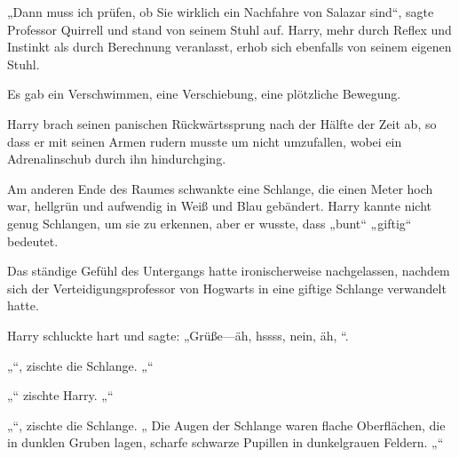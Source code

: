 „Dann muss ich prüfen, ob Sie wirklich ein Nachfahre von Salazar sind“, sagte Professor Quirrell und stand von seinem Stuhl auf. Harry, mehr durch Reflex und Instinkt als durch Berechnung veranlasst, erhob sich ebenfalls von seinem eigenen Stuhl.

Es gab ein Verschwimmen, eine Verschiebung, eine plötzliche Bewegung.

Harry brach seinen panischen Rückwärtssprung nach der Hälfte der Zeit ab, so dass er mit seinen Armen rudern musste um nicht umzufallen, wobei ein Adrenalinschub durch ihn hindurchging.

Am anderen Ende des Raumes schwankte eine Schlange, die einen Meter hoch war, hellgrün und aufwendig in Weiß und Blau gebändert. Harry kannte nicht genug Schlangen, um sie zu erkennen, aber er wusste, dass „bunt“ „giftig“ bedeutet.

Das ständige Gefühl des Untergangs hatte ironischerweise nachgelassen, nachdem sich der Verteidigungsprofessor von Hogwarts in eine giftige Schlange verwandelt hatte.

Harry schluckte hart und sagte: „Grüße—äh, hssss, nein, äh, “.

„“, zischte die Schlange. „“

„“ zischte Harry. „“

„“, zischte die Schlange. „ Die Augen der Schlange waren flache Oberflächen, die in dunklen Gruben lagen, scharfe schwarze Pupillen in dunkelgrauen Feldern. „“

